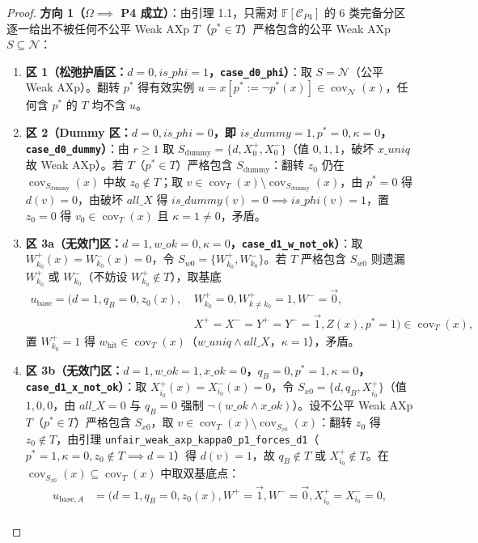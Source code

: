 \documentclass[11pt,a4paper]{article}
\newcommand{\F}{\mathbb{F}}
\newcommand{\C}{\mathcal{C}}
\newcommand{\N}{\mathcal{N}}
\newcommand{\cov}{\operatorname{cov}}
\newcommand{\code}[1]{\texttt{\small #1}}
\begin{document}
\begin{proof}
\textbf{方向 1（$\Omega \implies$ P4 成立）}：由引理 1.1，只需对 $\F[\C_{P4}]$ 的 6 类完备分区逐一给出不被任何不公平 Weak AXp $T$（$p^* \in T$）严格包含的公平 Weak AXp $S \subseteq \N$：
\begin{enumerate}
  \item \textbf{区 1（松弛护盾区：$d=0, is\_phi=1$，\code{case\_d0\_phi}）}：取 $S = \N$（公平 Weak AXp）。翻转 $p^*$ 得有效实例 $u = x[p^* := \neg p^*(x)] \in \cov_{\N}(x)$，任何含 $p^*$ 的 $T$ 均不含 $u$。
  \item \textbf{区 2（Dummy 区：$d=0, is\_phi=0$，即 $is\_dummy=1, p^*=0, \kappa=0$，\code{case\_d0\_dummy}）}：由 $r \ge 1$ 取 $S_{\mathrm{dummy}} = \{d, X_0^+, X_0^-\}$（值 $0,1,1$，破坏 $x\_uniq$ 故 Weak AXp）。若 $T$（$p^* \in T$）严格包含 $S_{\mathrm{dummy}}$：翻转 $z_0$ 仍在 $\cov_{S_{\mathrm{dummy}}}(x)$ 中故 $z_0 \notin T$；取 $v \in \cov_T(x) \setminus \cov_{S_{\mathrm{dummy}}}(x)$，由 $p^*=0$ 得 $d(v)=0$，由破坏 $all\_X$ 得 $is\_dummy(v)=0 \implies is\_phi(v)=1$，置 $z_0=0$ 得 $v_0 \in \cov_T(x)$ 且 $\kappa=1 \ne 0$，矛盾。
  \item \textbf{区 3a（无效门区：$d=1, w\_ok=0, \kappa=0$，\code{case\_d1\_w\_not\_ok}）}：取 $W_{k_0}^+(x)=W_{k_0}^-(x)=0$，令 $S_{w0}=\{W_{k_0}^+, W_{k_0}^-\}$。若 $T$ 严格包含 $S_{w0}$ 则遗漏 $W_{k_0}^+$ 或 $W_{k_0}^-$（不妨设 $W_{k_0}^+ \notin T$），取基底
  \[
    \begin{aligned}
      u_{\mathrm{base}}=(d=1, q_B=0, z_0(x),\ & W_{k_0}^+=0, W_{k\ne k_0}^+=1, W^-=\vec{0},\\
      & X^+=X^-=Y^+=Y^-=\vec{1}, Z(x), p^*=1) \in \cov_T(x),
    \end{aligned}
  \]
  置 $W_{k_0}^+=1$ 得 $w_{\mathrm{hit}} \in \cov_T(x)$（$w\_uniq \land all\_X$，$\kappa=1$），矛盾。
  \item \textbf{区 3b（无效门区：$d=1, w\_ok=1, x\_ok=0$，$q_B=0, p^*=1, \kappa=0$，\code{case\_d1\_x\_not\_ok}）}：取 $X_{i_0}^+(x)=X_{i_0}^-(x)=0$，令 $S_{x0}=\{d, q_B, X_{i_0}^+\}$（值 $1,0,0$，由 $all\_X=0$ 与 $q_B=0$ 强制 $\neg(w\_ok \land x\_ok)$）。设不公平 Weak AXp $T$（$p^* \in T$）严格包含 $S_{x0}$，取 $v \in \cov_T(x) \setminus \cov_{S_{x0}}(x)$：翻转 $z_0$ 得 $z_0 \notin T$，由引理 \code{unfair\_weak\_axp\_kappa0\_p1\_forces\_d1}（$p^*=1, \kappa=0, z_0 \notin T \implies d=1$）得 $d(v)=1$，故 $q_B \notin T$ 或 $X_{i_0}^+ \notin T$。在 $\cov_{S_{x0}}(x) \subseteq \cov_T(x)$ 中取双基底点：
  \[
    \begin{aligned}
      u_{\mathrm{base},A} &= (d=1, q_B=0, z_0(x), W^+=\vec{1}, W^-=\vec{0}, X_{i_0}^+=X_{i_0}^-=0,\\

\end{aligned}\]
\end{enumerate}
\end{proof}
\end{document}
